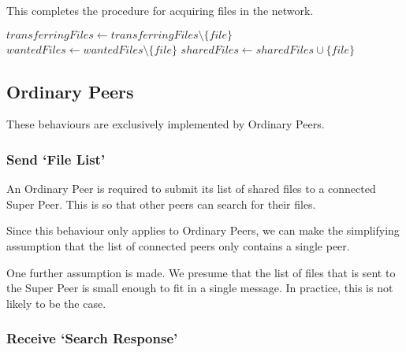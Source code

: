 This completes the procedure for acquiring files in the network.

\begin{algorithm}[H]

  $transferringFiles \leftarrow transferringFiles \setminus \{file\}$\;
  $wantedFiles \leftarrow wantedFiles \setminus \{file\}$\;
  $sharedFiles \leftarrow sharedFiles \cup \{file\}$\;
\end{algorithm}

\subsection{Ordinary Peers}

These behaviours are exclusively implemented by Ordinary Peers.

\subsubsection{Send `File List'}

An Ordinary Peer is required to submit its list of shared files to a connected
Super Peer.  This is so that other peers can search for their files.

Since this behaviour only applies to Ordinary Peers, we can make the simplifying
assumption that the list of connected peers only contains a single peer.

One further assumption is made.  We presume that the list of files that is sent
to the Super Peer is small enough to fit in a single message. In practice, this
is not likely to be the case.

\begin{algorithm}[H]

  \;
\end{algorithm}

\subsubsection{Receive `Search Response'}


